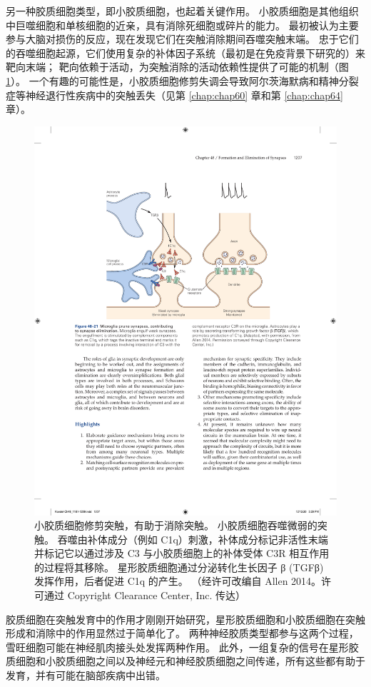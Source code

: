 另一种胶质细胞类型，即小胶质细胞，也起着关键作用。 小胶质细胞是其他组织中巨噬细胞和单核细胞的近亲，具有消除死细胞或碎片的能力。 最初被认为主要参与大脑对损伤的反应，现在发现它们在突触消除期间吞噬突触末端。 
忠于它们的吞噬细胞起源，它们使用复杂的补体因子系统（最初是在免疫背景下研究的）来靶向末端； 靶向依赖于活动，为突触消除的活动依赖性提供了可能的机制（图 \ref{fig:48_21}）。 
一个有趣的可能性是，小胶质细胞修剪失调会导致阿尔茨海默病和精神分裂症等神经退行性疾病中的突触丢失（见第 \ref{chap:chap60} 章和第 \ref{chap:chap64} 章）。

\begin{figure}[htbp]
	\centering
	\includegraphics[width=0.7\linewidth]{chap48/fig_48_21}
	\caption{小胶质细胞修剪突触，有助于消除突触。 小胶质细胞吞噬微弱的突触。 吞噬由补体成分（例如 C1q）刺激，补体成分标记非活性末端并标记它以通过涉及 C3 与小胶质细胞上的补体受体 C3R 相互作用的过程将其移除。 星形胶质细胞通过分泌转化生长因子 β (TGFβ) 发挥作用，后者促进 C1q 的产生。 （经许可改编自 Allen 2014。许可通过 Copyright Clearance Center, Inc. 传达）}
	\label{fig:48_21}
\end{figure}

胶质细胞在突触发育中的作用才刚刚开始研究，星形胶质细胞和小胶质细胞在突触形成和消除中的作用显然过于简单化了。 两种神经胶质类型都参与这两个过程，雪旺细胞可能在神经肌肉接头处发挥两种作用。 此外，一组复杂的信号在星形胶质细胞和小胶质细胞之间以及神经元和神经胶质细胞之间传递，所有这些都有助于发育，并有可能在脑部疾病中出错。



